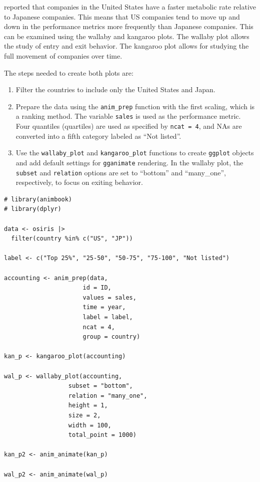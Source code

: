 \citet{oecd_report} reported that companies in the United States have a faster metabolic rate relative to Japanese companies. This means that US companies tend to move up and down in the performance metrics more frequently than Japanese companies. This can be examined using the wallaby and kangaroo plots. The wallaby plot allows the study of entry and exit behavior. The kangaroo plot allows for studying the full movement of companies over time.

The steps needed to create both plots are:

\begin{enumerate}
\def\labelenumi{\arabic{enumi}.}
\tightlist
\item
  Filter the countries to include only the United States and Japan.
\item
  Prepare the data using the \texttt{anim\_prep} function with the first scaling, which is a ranking method. The variable \texttt{sales} is used as the performance metric. Four quantiles (quartiles) are used as specified by \texttt{ncat\ =\ 4}, and NAs are converted into a fifth category labeled as ``Not listed''.
\item
  Use the \texttt{wallaby\_plot} and \texttt{kangaroo\_plot} functions to create \texttt{ggplot} objects and add default settings for \texttt{gganimate} rendering. In the wallaby plot, the \texttt{subset} and \texttt{relation} options are set to ``bottom'' and ``many\_one'', respectively, to focus on exiting behavior.
\end{enumerate}

\begin{verbatim}
# library(animbook)
# library(dplyr)

data <- osiris |> 
  filter(country %in% c("US", "JP"))

label <- c("Top 25%", "25-50", "50-75", "75-100", "Not listed")

accounting <- anim_prep(data, 
                      id = ID, 
                      values = sales, 
                      time = year, 
                      label = label, 
                      ncat = 4, 
                      group = country)

kan_p <- kangaroo_plot(accounting)

wal_p <- wallaby_plot(accounting,
                  subset = "bottom",
                  relation = "many_one",
                  height = 1,
                  size = 2,
                  width = 100,
                  total_point = 1000)

kan_p2 <- anim_animate(kan_p)

wal_p2 <- anim_animate(wal_p)
\end{verbatim}

